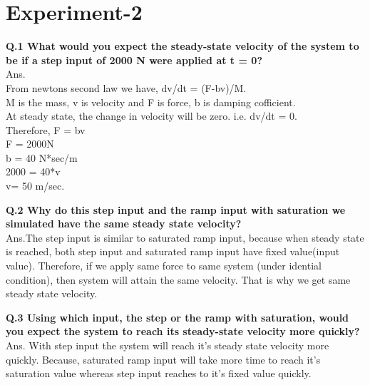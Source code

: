 \pagebreak
\section{Experiment-2}
\textbf{Q.1 What would you expect the steady-state velocity of the system to be if a step input of 2000
N were applied at t = 0?}
\\
Ans. \\
From newtons second law we have, dv/dt = (F-bv)/M.
\\ M is the mass, v is velocity and F is force, b is damping cofficient. 
\\
At steady state, the change in velocity will be zero. i.e. dv/dt = 0.
\\
Therefore, F = bv
\\F = 2000N
\\b = 40 N*sec/m
\\2000 = 40*v
\\v= 50 m/sec.

\textbf{Q.2 Why do this step input and the ramp input with saturation we simulated have the same steady state velocity?}
\\Ans.The step input is similar to saturated ramp input, because when steady state is reached, both step input and saturated ramp input
have fixed value(input value). Therefore, if we apply same force to same system (under idential condition), 
then system will attain the same velocity. That is why we get same steady state velocity.

\textbf{Q.3 Using which input, the step or the ramp with saturation, would you expect the system to reach its steady-state velocity more quickly?
}
\\Ans. With step input the system will reach it's steady state velocity more quickly. Because, 
saturated ramp input will take more time to reach it's saturation value whereas step input 
reaches to it's fixed value quickly. 